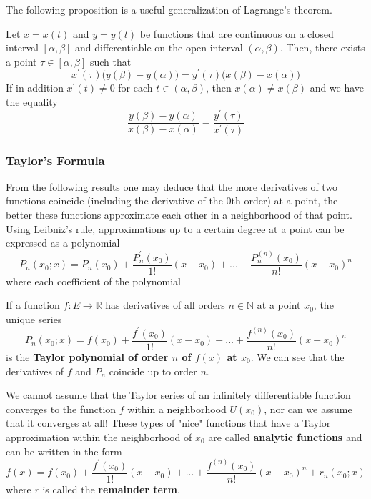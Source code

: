     The following proposition is a useful generalization of Lagrange's theorem. 
    \begin{theorem}
    Let $x = x(t)$ and $y = y(t)$ be functions that are continuous on a closed interval $[\alpha, \beta]$ and differentiable on the open interval $(\alpha, \beta)$. Then, there exists a point $\tau \in [\alpha, \beta]$ such that
    \[x^\prime (\tau) \big( y(\beta) - y (\alpha)\big) = y^\prime (\tau) \big( x(\beta) - x(\alpha)\big)\]
    If in addition $x^\prime (t) \neq 0$ for each $t \in (\alpha, \beta)$, then $x(\alpha) \neq x(\beta)$ and we have the equality 
    \[\frac{y(\beta) - y(\alpha)}{x(\beta) - x(\alpha)} = \frac{y^\prime (\tau)}{x^\prime (\tau)}\]
    \end{theorem}

    \subsubsection{Taylor's Formula}
    From the following results one may deduce that the more derivatives of two functions coincide (including the derivative of the $0$th order) at a point, the better these functions approximate each other in a neighborhood of that point. Using Leibniz's rule, approximations up to a certain degree at a point can be expressed as a polynomial 
    \[P_n (x_0; x) = P_n (x_0) + \frac{P_n^\prime (x_0)}{1!} (x-x_0) + ... + \frac{P_n^{(n)} (x_0)}{n!} (x-x_0)^n\]
    where each coefficient of the polynomial 

    \begin{definition}
      If a function $f:E \longrightarrow \mathbb{R}$ has derivatives of all orders $n \in \mathbb{N}$ at a point $x_0$, the unique series
      \[P_n (x_0; x) = f(x_0) + \frac{f^\prime (x_0)}{1!} (x-x_0) + ... + \frac{f^{(n)} (x_0)}{n!} (x-x_0)^n\]
      is the \textbf{Taylor polynomial of order $n$ of $f(x)$ at $x_0$}. We can see that the derivatives of $f$ and $P_n$ coincide up to order $n$. 
    \end{definition}

    \begin{definition}
      We cannot assume that the Taylor series of an infinitely differentiable function converges to the function $f$ within a neighborhood $U(x_0)$, nor can we assume that it converges at all! These types of "nice" functions that have a Taylor approximation within the neighborhood of $x_0$ are called \textbf{analytic functions} and can be written in the form 
      \[f(x) =  f(x_0) + \frac{f^\prime (x_0)}{1!} (x-x_0) + ... + \frac{f^{(n)} (x_0)}{n!} (x-x_0)^n + r_n (x_0; x)\]
      where $r$ is called the \textbf{remainder term}. 
    \end{definition}

